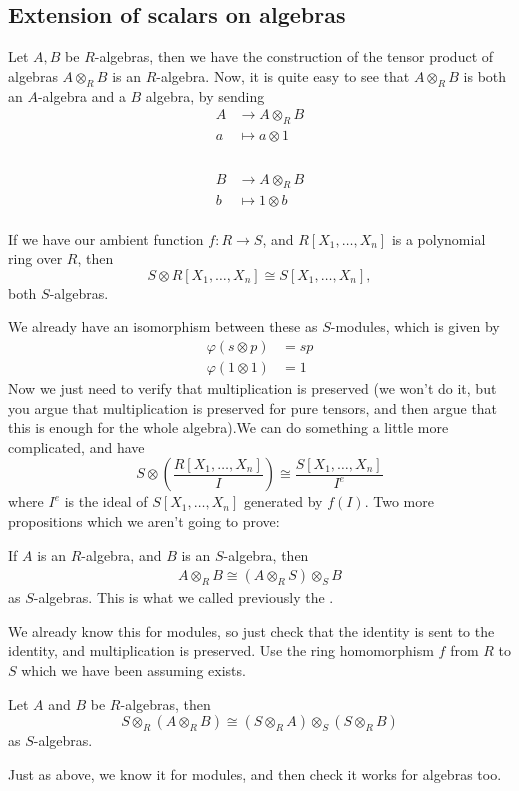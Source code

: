 \documentclass{article}
\begin{document}
\subsection{Extension of scalars on algebras}
Let $A,B$ be $R$-algebras, then we have the construction of the tensor product of algebras $A \otimes_{R} B$ is an $R$-algebra. Now, it is quite easy to see that $A \otimes_{R} B$ is both an $A$-algebra and a $B$ algebra, by sending \begin{align*}
    A &\to A \otimes_{R} B\\
    a &\mapsto a \otimes 1\\
\end{align*}
\hspace{0.1cm}\\
\begin{align*}
    B &\to A \otimes_{R} B\\
    b &\mapsto 1 \otimes b\\
\end{align*}
\begin{ex}
    If we have our ambient function $f: R \to S$, and $R[X_{1}, \dots, X_{n}]$ is a polynomial ring over $R$, then \[ S \otimes R[X_{1}, \dots, X_{n}] \cong S[X_{1}, \dots, X_{n}],\] both $S$-algebras. 
\end{ex}
\proof We already have an isomorphism between these as $S$-modules, which is given by 
\begin{align*} 
    \varphi(s \otimes p) &= sp\\
    \varphi(1 \otimes 1) &= 1
\end{align*}
Now we just need to verify that multiplication is preserved (we won't do it, but you argue that multiplication is preserved for pure tensors, and then argue that this is enough for the whole algebra).\gap We can do something a little more complicated, and have \[ S \otimes \left( \frac{R[X_{1}, \dots, X_{n}]}{I} \right) \cong \frac{S[X_{1}, \dots, X_{n}]}{I^{e}}\]
where $I^{e}$ is the ideal of $S[X_{1}, \dots, X_{n}]$ generated by $f(I)$. \gap 
Two more propositions which we aren't going to prove:
\begin{fancyprop}{}
    If $A$ is an $R$-algebra, and $B$ is an $S$-algebra, then \begin{align*}
        A \otimes_{R} B \cong (A \otimes_{R} S) \otimes_{S} B
    \end{align*}
    as $S$-algebras. This is what we called previously the .
\end{fancyprop}
\proof We already know this for modules, so just check that the identity is sent to the identity, and multiplication is preserved. Use the ring homomorphism $f$ from $R$ to $S$ which we have been assuming exists.
\begin{fancyprop}{}
    Let $A$ and $B$ be $R$-algebras, then \[ S \otimes_{R} (A \otimes_{R} B) \cong (S \otimes_{R} A) \otimes_{S} (S \otimes_{R} B)\] as $S$-algebras.
\end{fancyprop}
\proof Just as above, we know it for modules, and then check it works for algebras too.
\end{document}
